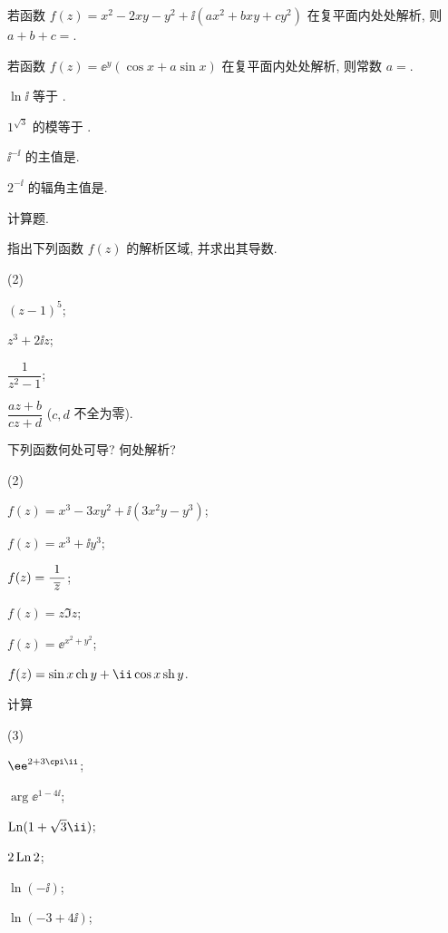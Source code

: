 \begin{homework}
\begin{homework}
    \item 若函数 $f(z)=x^2-2xy-y^2+\ii(ax^2+bxy+cy^2)$ 在复平面内处处解析, 则 $a+b+c=$\fillblank{}.
    \item 若函数 $f(z)=\ee^{y}(\cos x+a\sin x)$ 在复平面内处处解析, 则常数 $a=$\fillblank{}.
    \item $\ln \ii$ 等于 \fillblank{}.
    \item $1^{\sqrt3}$ 的模等于 \fillblank{}.
    \item $\ii^{-\ii}$ 的主值是\fillblank{}.
    \item $2^{-\ii}$ 的辐角主值是\fillblank{}.
  \end{homework}
  \item 计算题.
  \begin{homework}
    \item 指出下列函数 $f(z)$ 的解析区域, 并求出其导数.
      \begin{subhomework}(2)
        \item $(z-1)^5$;
        \item $z^3+2\ii z$;
        \item $\dfrac1{z^2-1}$;
        \item $\dfrac{az+b}{cz+d}$ ($c,d$ 不全为零).
      \end{subhomework}
    \item 下列函数何处可导? 何处解析?
      \begin{subhomework}(2)
        \item $f(z)=x^3-3xy^2+\ii(3x^2y-y^3)$;
        \item $f(z)=x^3+\ii y^3$;
        \item $f(z)=\dfrac1{~\overline z~}$;
        \item $f(z)=z\Im z$;
        \item $f(z)=\ee^{x^2+y^2}$;
        \item $f(z)=\sin x\ch y+\ii\cos x\sh y$.
      \end{subhomework}
    \item 计算
      \begin{subhomework}(3)
        \item $\ee^{2+3\cpi\ii}$;
        \item $\arg \ee^{1-4\ii}$;
        \item $\Ln(1+\sqrt3\ii)$;
        \item $2\operatorname{Ln}2$;
        \item $\ln(-\ii)$;
        \item $\ln(-3+4\ii)$;
      \end{subhomework}

\end{homework}
\end{homework}
